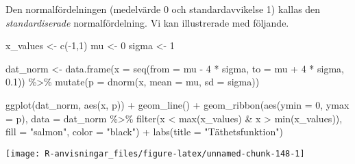 \documentclass[
]{book}
\newenvironment{Shaded}{\begin{snugshade}}{\end{snugshade}}
\newcommand{\AttributeTok}[1]{\textcolor[rgb]{0.77,0.63,0.00}{#1}}
\newcommand{\DecValTok}[1]{\textcolor[rgb]{0.00,0.00,0.81}{#1}}
\newcommand{\FloatTok}[1]{\textcolor[rgb]{0.00,0.00,0.81}{#1}}
\newcommand{\FunctionTok}[1]{\textcolor[rgb]{0.00,0.00,0.00}{#1}}
\newcommand{\NormalTok}[1]{#1}
\newcommand{\OtherTok}[1]{\textcolor[rgb]{0.56,0.35,0.01}{#1}}
\newcommand{\SpecialCharTok}[1]{\textcolor[rgb]{0.00,0.00,0.00}{#1}}
\newcommand{\StringTok}[1]{\textcolor[rgb]{0.31,0.60,0.02}{#1}}
\theoremstyle{definition}
\theoremstyle{definition}
\theoremstyle{definition}
\theoremstyle{definition}
\theoremstyle{remark}
\begin{document}
Den normalfördelningen (medelvärde 0 och standardavvikelse 1) kallas den \emph{standardiserade} normalfördelning. Vi kan illustrerade med följande.

\begin{Shaded}
\begin{Highlighting}[]
\NormalTok{x\_values }\OtherTok{\textless{}{-}} \FunctionTok{c}\NormalTok{(}\SpecialCharTok{{-}}\DecValTok{1}\NormalTok{,}\DecValTok{1}\NormalTok{)}
\NormalTok{mu }\OtherTok{\textless{}{-}} \DecValTok{0}
\NormalTok{sigma }\OtherTok{\textless{}{-}} \DecValTok{1}

\NormalTok{dat\_norm }\OtherTok{\textless{}{-}} \FunctionTok{data.frame}\NormalTok{(}\AttributeTok{x =} \FunctionTok{seq}\NormalTok{(}\AttributeTok{from =}\NormalTok{ mu }\SpecialCharTok{{-}} \DecValTok{4} \SpecialCharTok{*}\NormalTok{ sigma, }\AttributeTok{to =}\NormalTok{ mu }\SpecialCharTok{+} \DecValTok{4} \SpecialCharTok{*}\NormalTok{ sigma, }\FloatTok{0.1}\NormalTok{)) }\SpecialCharTok{\%\textgreater{}\%} 
  \FunctionTok{mutate}\NormalTok{(}\AttributeTok{p =} \FunctionTok{dnorm}\NormalTok{(x, }\AttributeTok{mean =}\NormalTok{ mu, }\AttributeTok{sd =}\NormalTok{ sigma))}

\FunctionTok{ggplot}\NormalTok{(dat\_norm, }\FunctionTok{aes}\NormalTok{(x, p)) }\SpecialCharTok{+}
  \FunctionTok{geom\_line}\NormalTok{() }\SpecialCharTok{+}
  \FunctionTok{geom\_ribbon}\NormalTok{(}\FunctionTok{aes}\NormalTok{(}\AttributeTok{ymin =} \DecValTok{0}\NormalTok{, }\AttributeTok{ymax =}\NormalTok{ p), }\AttributeTok{data =}\NormalTok{ dat\_norm }\SpecialCharTok{\%\textgreater{}\%} \FunctionTok{filter}\NormalTok{(x }\SpecialCharTok{\textless{}} \FunctionTok{max}\NormalTok{(x\_values) }\SpecialCharTok{\&}\NormalTok{ x }\SpecialCharTok{\textgreater{}} \FunctionTok{min}\NormalTok{(x\_values)), }\AttributeTok{fill =} \StringTok{"salmon"}\NormalTok{, }\AttributeTok{color =} \StringTok{"black"}\NormalTok{) }\SpecialCharTok{+}
  \FunctionTok{labs}\NormalTok{(}\AttributeTok{title =} \StringTok{"Täthetsfunktion"}\NormalTok{)}
\end{Highlighting}
\end{Shaded}

\begin{center}\texttt{[image: R-anvisningar\_files/figure-latex/unnamed-chunk-148-1]} \end{center}
\end{document}
